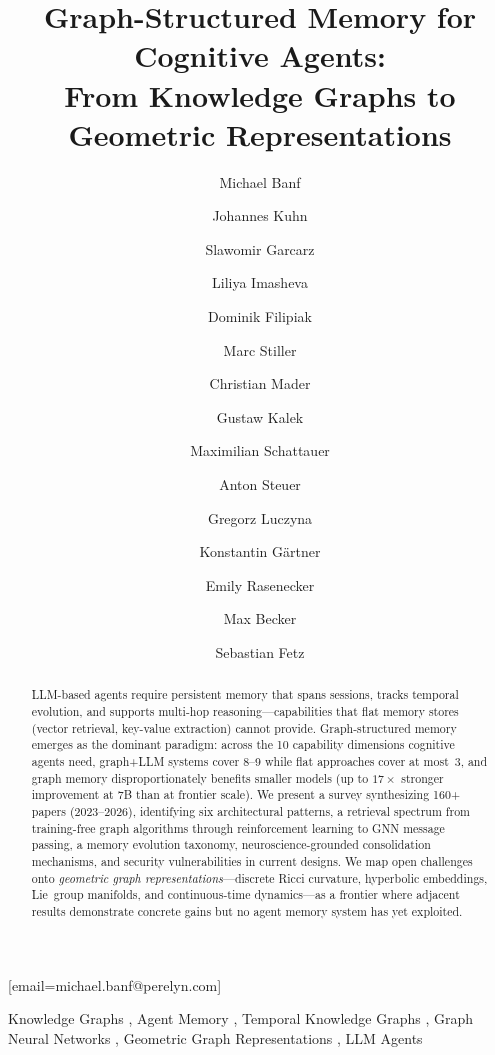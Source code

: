 \documentclass[hf]{ceurart}
\begin{document}


\title{Graph-Structured Memory for Cognitive Agents:\\
  From Knowledge Graphs to Geometric Representations}

\author{Michael Banf}[email=michael.banf@perelyn.com]
\author{Johannes Kuhn}
\author{Slawomir Garcarz}
\author{Liliya Imasheva}
\author{Dominik Filipiak}
\author{Marc Stiller}
\author{Christian Mader}
\author{Gustaw Kalek}
\author{Maximilian Schattauer}
\author{Anton Steuer}
\author{Gregorz Luczyna}
\author{Konstantin Gärtner}
\author{Emily Rasenecker}
\author{Max Becker}
\author{Sebastian Fetz}

\address{Perelyn GmbH, Munich, Germany}

\begin{abstract}
LLM-based agents require persistent memory that spans sessions, tracks
temporal evolution, and supports multi-hop reasoning---capabilities that
flat memory stores (vector retrieval, key-value extraction) cannot
provide. Graph-structured memory emerges as the dominant paradigm: across
the 10 capability dimensions cognitive agents need, graph+LLM systems
cover 8--9 while flat approaches cover at most~3, and graph memory
disproportionately benefits smaller models (up to $17\times$ stronger
improvement at 7B than at frontier scale).
We present a survey synthesizing 160+ papers (2023--2026), identifying
six architectural patterns, a retrieval spectrum from training-free
graph algorithms through reinforcement learning to GNN message passing,
a memory evolution taxonomy, neuroscience-grounded consolidation
mechanisms, and security vulnerabilities in current designs.
We map open challenges onto \emph{geometric graph
representations}---discrete Ricci curvature, hyperbolic embeddings,
Lie~group manifolds, and continuous-time dynamics---as a frontier where
adjacent results demonstrate concrete gains but no agent memory system
has yet exploited.
\end{abstract}

\begin{keywords}
  Knowledge Graphs \sep
  Agent Memory \sep
  Temporal Knowledge Graphs \sep
  Graph Neural Networks \sep
  Geometric Graph Representations \sep
  LLM Agents
\end{keywords}
\end{document}
